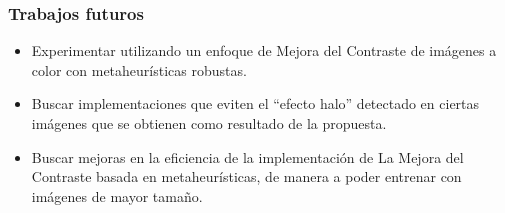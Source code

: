 \documentclass[usenames,dvipsnames]{beamer}
\begin{document}
\begin{frame}
\frametitle{Trabajos futuros} 
\begin{exampleblock}{}
\begin{itemize}
	\item Experimentar utilizando un enfoque de Mejora del Contraste de imágenes a color con metaheurísticas robustas.
	\item Buscar implementaciones que eviten el ``efecto halo'' detectado en ciertas imágenes que se obtienen como resultado de la propuesta.
	\item Buscar mejoras en la eficiencia de la implementación de La Mejora del Contraste basada en metaheurísticas, de manera a poder entrenar con imágenes de mayor tamaño.
\end{itemize}
\end{exampleblock}
\end{frame}
\end{document}
